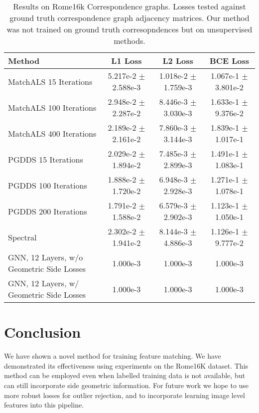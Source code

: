 \documentclass[10pt,twocolumn,letterpaper]{article}
\begin{document}
\begin{table*}
\begin{center}
\begin{tabular}{|l|c|c|c|}
\hline
Method                                    & L1 Loss                 & L2 Loss                 & BCE Loss \\
\hline\hline\hline
MatchALS 15 Iterations                    & 5.217e-2 $\pm$ 2.588e-3 & 1.018e-2 $\pm$ 1.759e-3 & 1.067e-1 $\pm$ 3.801e-2 \\ \hline
MatchALS 100 Iterations                   & 2.948e-2 $\pm$ 2.287e-2 & 8.446e-3 $\pm$ 3.030e-3 & 1.633e-1 $\pm$ 9.376e-2 \\ \hline
MatchALS 400 Iterations                   & 2.189e-2 $\pm$ 2.161e-2 & 7.860e-3 $\pm$ 3.144e-3 & 1.839e-1 $\pm$ 1.017e-1 \\ \hline
PGDDS 15 Iterations                       & 2.029e-2 $\pm$ 1.894e-2 & 7.485e-3 $\pm$ 2.899e-3 & 1.491e-1 $\pm$ 1.083e-1 \\ \hline
PGDDS 100 Iterations                      & 1.888e-2 $\pm$ 1.720e-2 & 6.948e-3 $\pm$ 2.928e-3 & 1.271e-1 $\pm$ 1.078e-1 \\ \hline
PGDDS 200 Iterations                      & 1.791e-2 $\pm$ 1.588e-2 & 6.579e-3 $\pm$ 2.902e-3 & 1.123e-1 $\pm$ 1.050e-1 \\ \hline
Spectral                                  & 2.302e-2 $\pm$ 1.941e-2 & 8.144e-3 $\pm$ 4.886e-3 & 1.126e-1 $\pm$ 9.777e-2 \\ \hline
GNN, 12 Layers, w/o Geometric Side Losses & 1.000e-3 & 1.000e-3 & 1.000e-3 \\ \hline
GNN, 12 Layers, w/ Geometric Side Losses  & 1.000e-3 & 1.000e-3 & 1.000e-3 \\ \hline
\hline
\end{tabular}
\end{center}
\caption{
Results on Rome16k Correspondence graphs.
Losses tested against ground truth correspondence graph adjacency matrices.
Our method was not trained on ground truth corresopndences but on unsupervised methods.
}
\end{table*}


\section{Conclusion}

We have shown a novel method for training feature matching.
We have demonstrated its effectiveness using experiments on the Rome16K dataset.
This method can be employed even when labelled training data is not available, but can still incorporate side geometric information.
For future work we hope to use more robust losses for outlier rejection, and to incorporate learning image level features into this pipeline.

{\small


}
\end{document}
